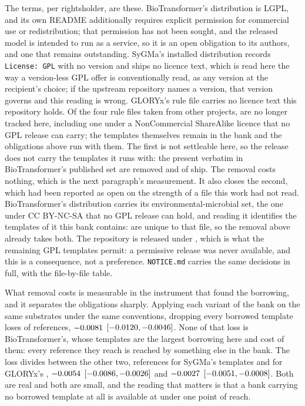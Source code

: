 \documentclass[journal=jcisd8,manuscript=suppinfo,layout=onecolumn]{achemso}
\begin{document}
The terms, per rightsholder, are these. BioTransformer's distribution is LGPL, and its own README
additionally requires explicit permission for commercial use or redistribution; that permission
has not been sought, and the released model is intended to run as a service, so it is an open
obligation to its authors, and one that remains outstanding. SyGMa's installed distribution records
\texttt{License: GPL} with no version and ships no licence text, which is read here the way a
version-less GPL offer is conventionally read, as any version at the recipient's choice; if the
upstream repository names a version, that version governs and this reading is wrong. GLORYx's rule
file carries no licence text this repository holds. Of the four rule files taken from other
projects, \numThirdpartyFilesunusedWord{} are no longer tracked here, including one under a
NonCommercial ShareAlike licence that no GPL release can carry; the templates themselves remain in
the bank and the obligations above run with them. The first is not settleable here, so the release
does not carry the templates it
runs with: the \numRelbankRemoved{} present verbatim in BioTransformer's published set are removed
and \numRelbankReleased{} of \numRelbankMeasured{} ship. The removal costs nothing, which is the
next paragraph's measurement. It also closes the second, which had been reported as open on the
strength of a file this work had not read. BioTransformer's distribution carries its
environmental-microbial set, the one under CC BY-NC-SA that no GPL release can hold, and reading it
identifies the \numRelbankEnvmicroWord{} templates of it this bank contains:
\numRelbankEnvmicroonly{} are unique to that file, so the removal above
already takes both. The repository is released under \RepoLicence{}, which is what the
remaining GPL templates permit: a permissive release was never available, and this is a
consequence, not a preference.
\texttt{NOTICE.md} carries the same decisions in full, with the file-by-file table.

What removal costs is measurable in the instrument that found the borrowing, and it separates the
obligations sharply. Applying each variant of the bank on the same substrates under the same
conventions, dropping every borrowed template loses \numLrcAllLost{} of \numLrcReferences{}
references, $-0.0081$ $[-0.0120, -0.0046]$. None of that loss is
BioTransformer's, whose \numThirdpartyBiotransformerShipped{} templates are the largest borrowing
here and cost \numLrcBtLostWord{} of them: every reference they reach is reached by something
else in the bank. The loss divides between the other two, \numLrcSygmaLost{} references for SyGMa's
\numLrcSygmaDropped{} templates and \numLrcGloryxLost{} for GLORYx's \numLrcGloryxDropped{},
$-0.0054$ $[-0.0086, -0.0026]$ and $-0.0027$
$[-0.0051, -0.0008]$. Both are real and both are small, and the reading that
matters is that a bank carrying no borrowed template at all is available at under one point of
reach. \CuratedProvenance{}
\end{document}
